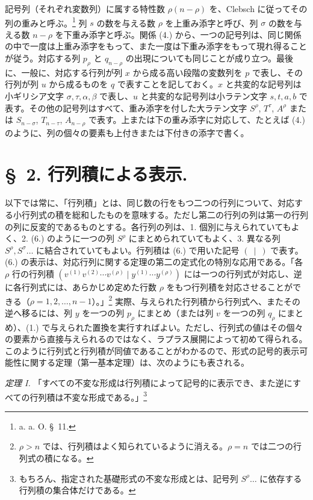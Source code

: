 \documentclass[11pt]{article}
\begin{document}
記号列（それぞれ変数列）に属する特性数 $\rho(n-\rho)$ を、Clebsch に従ってその列の重みと呼ぶ。\footnote{a. a. O. \S\ 11.} 列 $s$ の数を与える数 $\rho$ を上重み添字と呼び、列 $\sigma$ の数を与える数 $n-\rho$ を下重み添字と呼ぶ。関係 (4.) から、一つの記号列は、同じ関係の中で一度は上重み添字をもって、また一度は下重み添字をもって現れ得ることが従う。対応する列 $p_\rho$ と $q_{n-\rho}$ の出現についても同じことが成り立つ。最後に、一般に、対応する行列が列 $x$ から成る高い段階の変数列を $p$ で表し、その行列が列 $u$ から成るものを $q$ で表すことを記しておく。$x$ と共変的な記号列は小ギリシア文字 $\sigma,\tau,\alpha,\beta$ で表し、$u$ と共変的な記号列は小ラテン文字 $s,t,a,b$ で表す。その他の記号列はすべて、重み添字を付した大ラテン文字 $S^\rho$, $T^\tau$, $A^\rho$ または $S_{n-\sigma}$, $T_{n-\tau}$, $A_{n-\rho}$ で表す。上または下の重み添字に対応して、たとえば (4.) のように、列の個々の要素も上付きまたは下付きの添字で書く。
\clearpage
\section*{\S\ 2. 行列積による表示.}
以下では常に、「行列積」とは、同じ数の行をもつ二つの行列について、対応する小行列式の積を総和したものを意味する。ただし第二の行列の列は第一の行列の列に反変的であるものとする。各行列の列は、1. 個別に与えられていてもよく、2. (6.) のように一つの列 $S^\rho$ にまとめられていてもよく、3. 異なる列 $S^\rho,S^\sigma\ldots$ に結合されていてもよい。行列積は (6.) で用いた記号 $(\ \mid\ )$ で表す。(6.) の表示は、対応行列に関する定理の第二の定式化の特別な応用である。「各 $\rho$ 行の行列積 $(v^{(1)}v^{(2)}\cdots v^{(\rho)}\mid y^{(1)}\cdots y^{(\rho)})$ には一つの行列式が対応し、逆に各行列式には、あらかじめ定めた行数 $\rho$ をもつ行列積を対応させることができる（$\rho=1,2,\ldots,n-1$）。」\footnote{$\rho>n$ では、行列積はよく知られているように消える。$\rho=n$ では二つの行列式の積になる。} 実際、与えられた行列積から行列式へ、またその逆へ移るには、列 $y$ を一つの列 $p_\rho$ にまとめ（または列 $v$ を一つの列 $q_\rho$ にまとめ）、(1.) で与えられた置換を実行すればよい。ただし、行列式の値はその個々の要素から直接与えられるのではなく、ラプラス展開によって初めて得られる。このように行列式と行列積が同値であることがわかるので、形式の記号的表示可能性に関する定理（第一基本定理）は、次のようにも表される。

\emph{定理 I.} 「すべての不変な形成は行列積によって記号的に表示でき、また逆にすべての行列積は不変な形成である。」\footnote{もちろん、指定された基礎形式の不変な形成とは、記号列 $S^\rho\ldots$ に依存する行列積の集合体だけである。}
\end{document}
